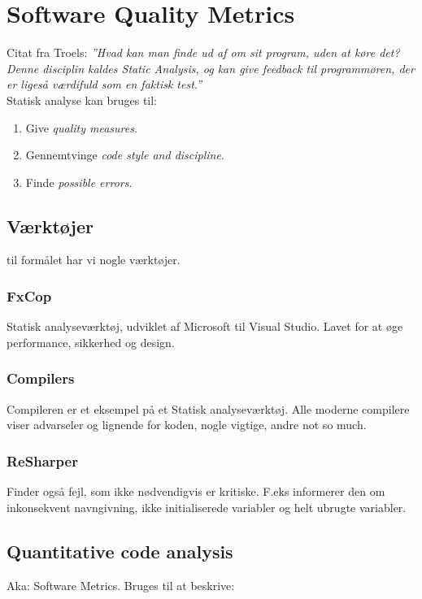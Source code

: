 \section{Software Quality Metrics}
Citat fra Troels: \textit{''Hvad kan man finde ud af om sit program, uden at køre det? Denne disciplin kaldes Static Analysis, og kan give feedback til programmøren, der er ligeså værdifuld som en faktisk test.''}\\

Statisk analyse kan bruges til: 

\begin{enumerate}
	\item Give \textit{quality measures}.
	\item Gennemtvinge \textit{code style and discipline}.
	\item Finde \textit{possible errors}.
\end{enumerate}

\subsection{Værktøjer} til formålet har vi nogle værktøjer.

\subsubsection{FxCop}
Statisk analyseværktøj, udviklet af Microsoft til Visual Studio. Lavet for at øge performance, sikkerhed og design.

\subsubsection{Compilers}
Compileren er et eksempel på et Statisk analyseværktøj. Alle moderne compilere viser advarseler og lignende for koden, nogle vigtige, andre not so much.

\subsubsection{ReSharper}
Finder også fejl, som ikke nødvendigvis er kritiske. F.eks informerer den om inkonsekvent navngivning, ikke initialiserede variabler og helt ubrugte variabler.

\subsection{Quantitative code analysis}
Aka: Software Metrics. Bruges til at beskrive: 

